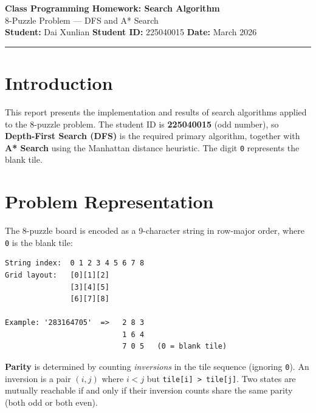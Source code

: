 \documentclass[12pt, a4paper]{article}
\begin{document}
\begin{center}
  {\LARGE\bfseries\color{deepblue} Class Programming Homework: Search Algorithm}\\[6pt]
  {\large\color{midblue} 8-Puzzle Problem --- DFS and A* Search}\\[10pt]
  {\normalsize
    \textbf{Student:} Dai Xunlian \quad
    \textbf{Student ID:} 225040015 \quad
    \textbf{Date:} March 2026
  }\\[4pt]
  \noindent\rule{\linewidth}{1.5pt}
\end{center}

\vspace{4pt}

\section{Introduction}

This report presents the implementation and results of search algorithms applied to the 8-puzzle problem. The student ID is \textbf{225040015} (odd number), so \textbf{Depth-First Search (DFS)} is the required primary algorithm, together with \textbf{A* Search} using the Manhattan distance heuristic. The digit \texttt{0} represents the blank tile.

\section{Problem Representation}

The 8-puzzle board is encoded as a 9-character string in row-major order, where \texttt{0} is the blank tile:

\begin{lstlisting}[style=mono]
String index:  0 1 2 3 4 5 6 7 8
Grid layout:   [0][1][2]
               [3][4][5]
               [6][7][8]

Example: '283164705'  =>   2 8 3
                           1 6 4
                           7 0 5   (0 = blank tile)
\end{lstlisting}

\textbf{Parity} is determined by counting \emph{inversions} in the tile sequence (ignoring \texttt{0}). An inversion is a pair $(i, j)$ where $i < j$ but \texttt{tile[i] > tile[j]}. Two states are mutually reachable if and only if their inversion counts share the same parity (both odd or both even).
\end{document}
